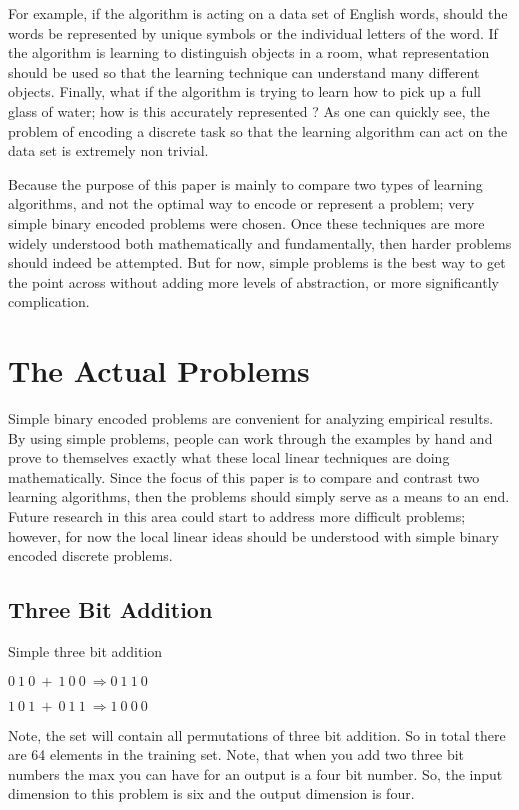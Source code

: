 	For example, if the algorithm is acting on a data set of
English words, should the words be represented by unique symbols or
the individual letters of the word.  If the algorithm is learning to
distinguish objects in a room, what representation should be used so
that the learning technique can understand many different objects.
Finally, what if the algorithm is trying to learn how to pick up a
full glass of water; how is this accurately represented ?  As one can
quickly see, the problem of encoding a discrete task so that the
learning algorithm can act on the data set is extremely non trivial.

	Because the purpose of this paper is mainly to compare two
types of learning algorithms, and not the optimal way to encode or
represent a problem; very simple binary encoded problems were chosen.
Once these techniques are more widely understood both mathematically
and fundamentally, then harder problems should indeed be attempted.
But for now, simple problems is the best way to get the point across
without adding more levels of abstraction, or more significantly
complication. 

\section{The Actual Problems}

	Simple binary encoded problems are convenient for analyzing
empirical results.  By using simple problems, people can work through
the examples by hand and prove to themselves exactly what these local
linear techniques are doing mathematically.  Since the focus of this
paper is to compare and contrast two learning algorithms, then the
problems should simply serve as a means to an end.  Future research in
this area could start to address more difficult problems; however, for
now the local linear ideas should be understood with simple binary
encoded discrete problems.

\subsection{Three Bit Addition}

	Simple three bit addition

	$0\  1\  0\   +\   1\  0\  0\   \Longrightarrow  0\ 1\  1\  0$

        $1\  0\  1\   +\   0\  1\  1\   \Longrightarrow  1\ 0\  0\  0$

	Note, the set will contain all permutations of three bit
addition.  So in total there are 64 elements in the training set.
Note, that when you add two three bit numbers the max you can have for
an output is a four bit number.  So, the input dimension to this
problem is six and the output dimension is four.

